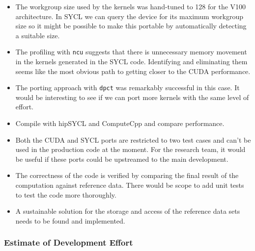 \begin{itemize}
	\item The workgroup size used by the kernels was hand-tuned to 128 for the V100 architecture. In SYCL we can query the device for its maximum workgroup size so it might be possible to make this portable by automatically detecting a suitable size.
	\item The profiling with \verb #ncu# suggests that there is unnecessary memory movement in the kernels generated in the SYCL code. Identifying and eliminating them seems like the most obvious path to getting closer to the CUDA performance.
	\item The porting approach with \verb #dpct# was remarkably successful in this case. It would be interesting to see if we can port more kernels with the same level of effort.
	\item Compile with hipSYCL and ComputeCpp and compare performance.
	\item Both the CUDA and SYCL ports are restricted to two test cases and can't be used in the production code at the moment. For the research team, it would be useful if these ports could be upstreamed to the main development.
	\item The correctness of the code is verified by comparing the final result of the computation against reference data. There would be scope to add unit tests to test the code more thoroughly.
	\item A sustainable solution for the storage and access of the reference data sets needs to be found and implemented. 
\end{itemize}

\subsubsection{Estimate of Development Effort}\label{sec:openqcd_personhours}
